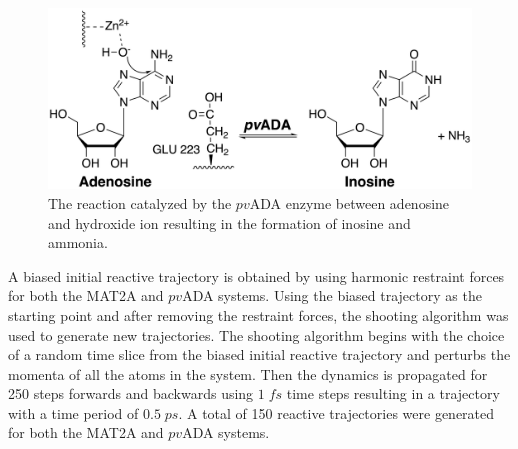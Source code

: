 \documentclass[journal=jpcbfk,manuscript=article,layout=traditional]{achemso}
\begin{document}
\begin{figure}
\includegraphics[width=\columnwidth]{figures/ada-reaction.png}
\caption{The reaction catalyzed by the $pv$ADA enzyme between adenosine and hydroxide ion
resulting in the formation of inosine and ammonia.}
\label{fig:ada-reaction}
\end{figure}

A biased initial reactive trajectory is obtained by using harmonic restraint forces 
for both the MAT2A and $pv$ADA systems. 
Using the biased trajectory as the starting point and after removing the restraint 
forces, the shooting algorithm \cite{dellago02AdvChemPhys123} was used to generate
new trajectories. The shooting algorithm begins with the choice of a 
random time slice from the biased initial reactive trajectory and perturbs 
the momenta of all the atoms in the system. Then the dynamics is propagated for 
250 steps forwards and backwards using $1\;fs$ time steps
resulting in a trajectory with a time period of $0.5\;ps$.
A total of 150 reactive trajectories were generated for both the MAT2A and $pv$ADA
systems.
\end{document}
